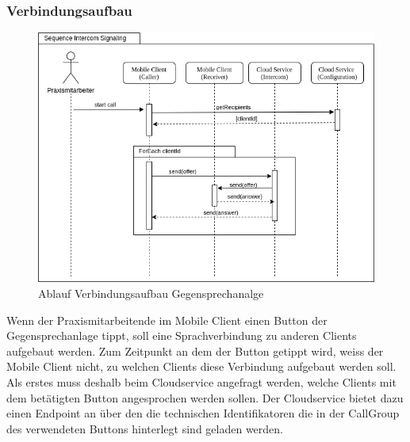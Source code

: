 \clearpage
\subsubsection{Verbindungsaufbau}

\begin{figure}[h]
    \centering
    \begin{minipage}[b]{0.9\textwidth}
        \includegraphics[width=\textwidth]{graphics/diagramms/Sequence_Intercom_Broking_V02}
        \caption{Ablauf Verbindungsaufbau Gegensprechanalge}
    \end{minipage}
\end{figure}

Wenn der Praxismitarbeitende im Mobile Client einen Button der Gegensprechanlage tippt, soll eine Sprachverbindung zu anderen Clients aufgebaut werden.
Zum Zeitpunkt an dem der Button getippt wird, weiss der Mobile Client nicht, zu welchen Clients diese Verbindung aufgebaut werden soll.
Als erstes muss deshalb beim Cloudservice angefragt werden, welche Clients mit dem betätigten Button angesprochen werden sollen.
Der Cloudservice bietet dazu einen Endpoint an über den die technischen Identifikatoren die in der CallGroup des verwendeten Buttons hinterlegt sind geladen werden.

